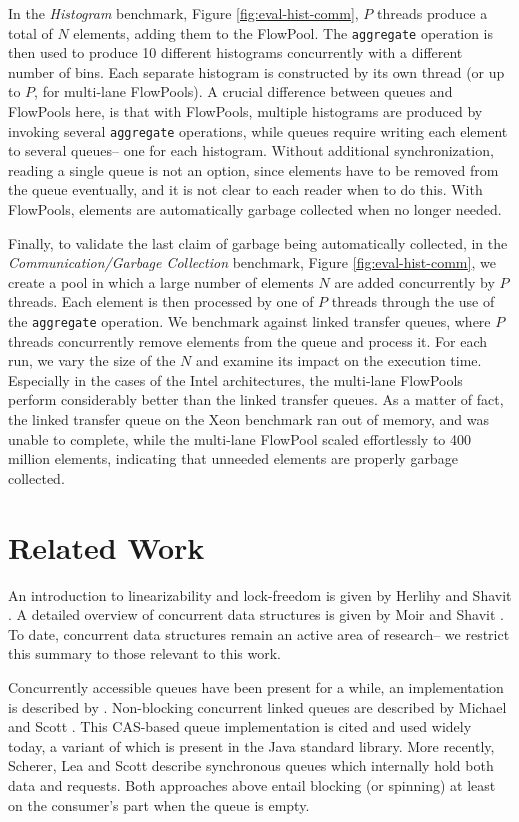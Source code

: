 In the \textit{Histogram} benchmark, Figure \ref{fig:eval-hist-comm}, $P$ threads produce a total of
$N$ elements, adding them to the FlowPool.
The \verb=aggregate= operation is then used to produce 10 different
histograms concurrently with a different number of bins.
Each separate histogram is constructed by its own thread (or up to
$P$, for multi-lane FlowPools).
A crucial difference between queues and FlowPools here, is that with
FlowPools, multiple histograms are produced
by invoking several \verb=aggregate= operations, while queues require
writing each element to several queues-- one for each histogram.
Without additional synchronization, reading a single queue is not an
option, since elements have to be removed from the queue eventually, and
it is not clear to each reader when to do this.
With FlowPools, elements are automatically garbage collected when no
longer needed.

Finally, to validate the last claim of garbage being automatically
collected, in the \textit{Communication/Garbage Collection} benchmark,
Figure \ref{fig:eval-hist-comm}, we create a pool in which a
large number of elements $N$ are added concurrently by $P$
threads. Each element is then processed by one of $P$ threads through
the use of the \verb=aggregate= operation.
We benchmark against linked transfer queues, where $P$ threads concurrently remove
elements from the queue and process it.
For each run, we vary the size of the $N$ and examine its impact on the execution time.
Especially in the cases of the Intel architectures, the multi-lane
FlowPools perform considerably better than the linked transfer queues.
As a matter of fact, the linked transfer queue on the Xeon benchmark ran out of
memory, and was unable to complete, while the multi-lane FlowPool scaled effortlessly
to 400 million elements, indicating that unneeded elements are properly garbage collected.


\section{Related Work}

An introduction to linearizability and lock-freedom
is given by Herlihy and Shavit \cite{Herlihy08}.
A detailed overview of concurrent data structures is given
by Moir and Shavit \cite{Moir05}.
To date, concurrent data structures remain an active area of
research-- we restrict this summary to those relevant to this work.

Concurrently accessible queues have been present for a while,
an implementation is described by \cite{Mellor87}.
Non-blocking concurrent linked queues are described by Michael and
Scott \cite{Michael96}. This CAS-based
queue implementation is cited and used widely today, a variant of
which is present in the Java standard library.
More recently, Scherer, Lea and Scott \cite{SchererLS09} describe
synchronous queues which internally hold both data and requests.
Both approaches above entail blocking (or spinning) at least on the
consumer's part when the queue is empty.

